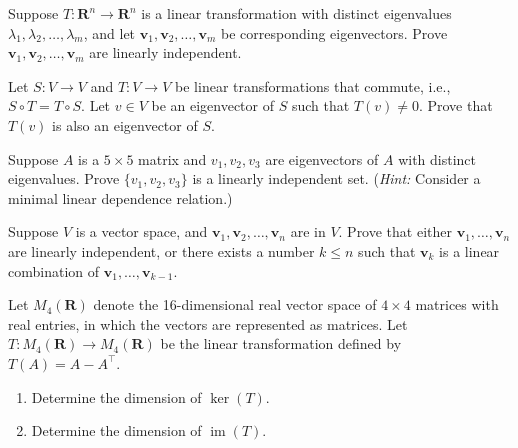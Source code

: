 \documentclass[11pt,twoside,openany]{memoir}
\begin{document}
        \begin{exercise}
        Suppose $T: \mathbf{R}^n \to \mathbf{R}^n$ is a linear transformation with distinct eigenvalues $\lambda_1, \lambda_2, \ldots, \lambda_m$, and let $\mathbf{v}_1, \mathbf{v}_2, \ldots, \mathbf{v}_m$ be corresponding eigenvectors. Prove $\mathbf{v}_1, \mathbf{v}_2, \ldots, \mathbf{v}_m$ are linearly independent.
        \end{exercise}
        
        \begin{exercise}
        Let $S: V \to V$ and $T: V \to V$ be linear transformations that commute, i.e., $S \circ T = T \circ S$. Let $v \in V$ be an eigenvector of $S$ such that $T(v) \neq 0$. Prove that $T(v)$ is also an eigenvector of $S$.
        \end{exercise}
        
        \begin{exercise}
        Suppose $A$ is a $5 \times 5$ matrix and $v_1, v_2, v_3$ are eigenvectors of $A$ with distinct eigenvalues. Prove $\{v_1, v_2, v_3\}$ is a linearly independent set. (\textit{Hint:} Consider a minimal linear dependence relation.)
        \end{exercise}
        
        \begin{exercise}
        Suppose $V$ is a vector space, and $\mathbf{v}_1, \mathbf{v}_2, \ldots, \mathbf{v}_n$ are in $V$. Prove that either $\mathbf{v}_1, \ldots, \mathbf{v}_n$ are linearly independent, or there exists a number $k \leq n$ such that $\mathbf{v}_k$ is a linear combination of $\mathbf{v}_1, \ldots, \mathbf{v}_{k-1}$.
        \end{exercise}
        
        \begin{exercise}
        Let $M_4(\mathbf{R})$ denote the 16-dimensional real vector space of $4 \times 4$ matrices with real entries, in which the vectors are represented as matrices. Let $T: M_4(\mathbf{R}) \to M_4(\mathbf{R})$ be the linear transformation defined by $T(A) = A - A^\top$.
        \begin{enumerate}[label = (\arabic*)]
            \item Determine the dimension of $\operatorname{ker}(T)$.
            \item Determine the dimension of $\operatorname{im}(T)$.
        \end{enumerate}
        \end{exercise}
        
\end{document}

